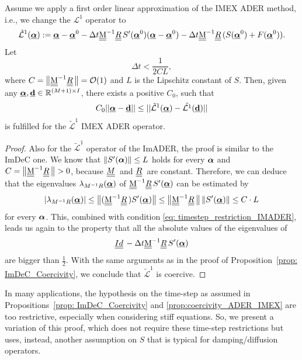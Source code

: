 \begin{prop}\label{prop:coercivity_ADER_IMEX}
	Assume we apply a first order linear approximation of the IMEX ADER method, i.e., we change the $\mathcal{L}^1$ operator to
	\begin{equation}
	\label{eq: L1_linearized_ADER}
	\tilde{\mathcal{L}}^1(\bbc):=\bbc-\bbc^0-\Delta t \M^{-1}\mat{R} S'(\bbc^0)(\bbc -\bbc^0) -\Delta t \M^{-1}\mat{R} (S(\bbc^0)+F(\bbc^0)).
	\end{equation}
	Let
	\begin{equation}\label{eq: timestep_restriction_IMADER}
	\Delta t< \frac{1}{2CL},
	\end{equation}
	where $C=\norm{\M^{-1}\mat{R}}=\mathcal{O}(1)$ and $L$ is the Lipschitz constant of $S$. 
	Then, given any $\underline{\boldsymbol{\alpha}}, \underline{\mathbf{d}} \in \mathbb{R}^{(M+1)\times I}$, there exists a positive $C_0$, such that
	\begin{equation*}
	C_0||\underline{\boldsymbol{\alpha}}-\underline{\mathbf{d}}||\leq ||\tilde{\mathcal{L}}^1 (\underline{\boldsymbol{\alpha}})-\tilde{\mathcal{L}^1} (\underline{\mathbf{d}})||
	\end{equation*}
	is fulfilled for the $\tilde{\mathcal{L}}^1$ IMEX ADER operator.
\end{prop}
\begin{proof}
	Also for the $\tilde{\mathcal{L}}^1$ operator of the ImADER, the proof is similar to the ImDeC one. 
	We know that $\left\lVert S'(\boldsymbol{\alpha})\right\rVert\le L$ holds for every $\boldsymbol{\alpha}$ and $C=\norm{\M^{-1}\mat{R}}>0$, because $\mat{M}$ and $\mat{R}$ are constant. 
	Therefore, we can deduce that the eigenvalues $\lambda_{M^{-1}R}(\underline{\boldsymbol{\alpha}})$ of $\M^{-1}\mat{R}S'(\bbc)$ can be estimated by 
	\begin{equation*}
	\lvert \lambda_{M^{-1}R}(\bbc) \rvert \le \norm{(\M^{-1}\mat{R})S'(\bbc)} \le \norm{\M^{-1}\mat{R}}\norm{S'(\bbc)} \le C \cdot L
	\end{equation*}
	for every $\boldsymbol{\alpha}$. 
	This, combined with condition \eqref{eq: timestep_restriction_IMADER}, leads us again to the property that all the absolute values of the eigenvalues of
	\begin{equation*}
	\mat{Id}-\Delta t \M^{-1}\mat{R}S'(\bbc)
	\end{equation*} 
	are bigger than $\frac{1}{2}$.
	With the same arguments as in the proof of Proposition~\ref{prop: ImDeC_Coercivity}, we conclude that $\tilde{\mathcal{L}}^1$ is coercive.
\end{proof}
In many applications, the hypothesis on the time-step as assumed in Propositions~\ref{prop: ImDeC_Coercivity} and \ref{prop:coercivity_ADER_IMEX} are too restrictive, especially when considering stiff equations. So, we present a variation of this proof, which does not require these time-step restrictions but uses, instead, another assumption on $S$ that is typical for damping/diffusion operators.
